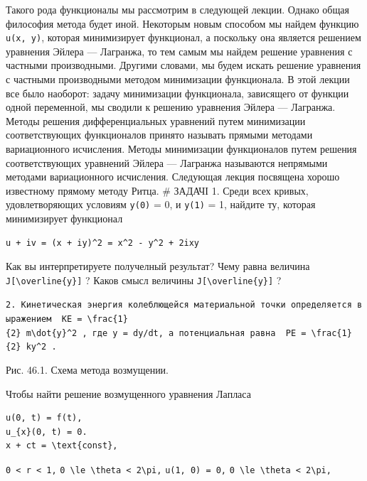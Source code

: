 \documentclass[
  ukrainian,
]{article}
\begin{document}
Такого рода функционалы мы рассмотрим в следующей лекции. Однако общая
философия метода будет иной. Некоторым новым способом мы найдем функцию
\texttt{u(x,\ y)}, которая минимизирует функционал, а поскольку она
является решением уравнения Эйлера --- Лагранжа, то тем самым мы найдем
решение уравнения с частными производными. Другими словами, мы будем
искать решение уравнения с частными производными методом минимизации
функционала. В этой лекции все было наоборот: задачу минимизации
функционала, зависящего от функции одной переменной, мы сводили к
решению уравнения Эйлера --- Лагранжа. Методы решения дифференциальных
уравнений путем минимизации соответствующих функционалов принято
называть прямыми методами вариационного исчисления. Методы минимизации
функционалов путем решения соответствующих уравнений Эйлера --- Лагранжа
называются непрямыми методами вариационного исчисления. Следующая лекция
посвящена хорошо известному прямому методу Ритца. \# ЗАДАЧІ 1. Среди
всех кривых, удовлетворяющих условиям \texttt{y(0)} = 0, и \texttt{y(1)}
= 1, найдите ту, которая минимизирует функционал

\begin{verbatim}
u + iv = (x + iy)^2 = x^2 - y^2 + 2ixy
\end{verbatim}

Как вы интерпретируете получелный результат? Чему равна величина
\texttt{J{[}\textbackslash{}overline\{y\}{]}} ? Каков смысл величины
\texttt{J{[}\textbackslash{}overline\{y\}{]}} ?

\texttt{2.\ Кинетическая\ энергия\ колеблющейся\ материальной\ точки\ определяется\ выражением\ \ \textquotesingle{}KE\ =\ \textbackslash{}frac\{1\}\{2\}\ m\textbackslash{}dot\{y\}\^{}2\textquotesingle{}\ ,\ где\ y\ =\ dy/dt,\ а\ потенциальная\ равна\ \ \textquotesingle{}PE\ =\ \textbackslash{}frac\{1\}\{2\}\ ky\^{}2\textquotesingle{}\ .}

Рис. 46.1. Схема метода возмущении.

Чтобы найти решение возмущенного уравнения Лапласа

\begin{verbatim}
u(0, t) = f(t),
u_{x}(0, t) = 0.
x + ct = \text{const},
\end{verbatim}

\texttt{0\ \textless{}\ r\ \textless{}\ 1,}
\texttt{0\ \textbackslash{}le\ \textbackslash{}theta\ \textless{}\ 2\textbackslash{}pi,}
\texttt{u(1,\ 0)\ =\ 0,}
\texttt{0\ \textbackslash{}le\ \textbackslash{}theta\ \textless{}\ 2\textbackslash{}pi,}
\end{document}
